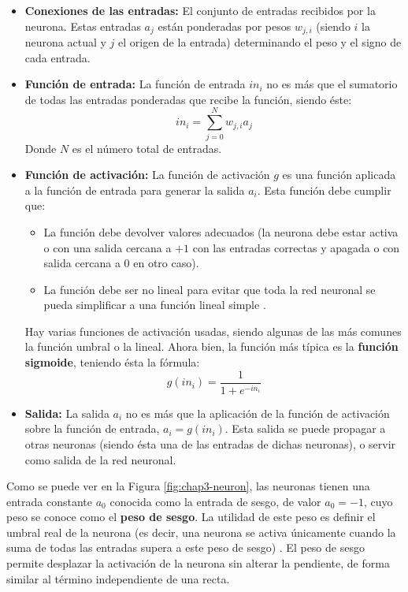 \begin{itemize}
	\item \textbf{Conexiones de las entradas:} El conjunto de entradas recibidos por la neurona. Estas entradas $a_j$ están ponderadas por pesos $w_{j,i}$ (siendo $i$ la neurona actual y $j$ el origen de la entrada) determinando el peso y el signo de cada entrada.
	\item \textbf{Función de entrada:} La función de entrada $in_i$ no es más que el sumatorio de todas las entradas ponderadas que recibe la función, siendo éste:
	\[in_i=\sum_{j=0}^N w_{j,i}a_j\]
Donde $N$ es el número total de entradas.
	\item \textbf{Función de activación:} La función de activación $g$ es una función aplicada a la función de entrada para generar la salida $a_i$. Esta función debe cumplir que:
	\begin{itemize}
		\item La función debe devolver valores adecuados (la neurona debe estar activa o con una salida cercana a $+1$ con las entradas correctas y apagada o con salida cercana a $0$ en otro caso).
		\item La función debe ser no lineal para evitar que toda la red neuronal se pueda simplificar a una función lineal simple \cite{alma991004256519704990}.
	\end{itemize}
	Hay varias funciones de activación usadas, siendo algunas de las más comunes la función umbral o la lineal. Ahora bien, la función más típica es la \textbf{función sigmoide}, teniendo ésta la fórmula:
	\[g(in_i)=\frac{1}{1+e^{-in_i}}\]
	\item \textbf{Salida:} La salida $a_i$ no es más que la aplicación de la función de activación sobre la función de entrada, $a_i = g(in_i)$. Esta salida se puede propagar a otras neuronas (siendo ésta una de las entradas de dichas neuronas), o servir como salida de la red neuronal.
\end{itemize}

	Como se puede ver en la Figura \ref{fig:chap3-neuron}, las neuronas tienen una entrada constante $a_0$ conocida como la entrada de sesgo, de valor $a_0 = -1$, cuyo peso se conoce como el \textbf{peso de sesgo}. La utilidad de este peso es definir el umbral real de la neurona (es decir, una neurona se activa únicamente cuando la suma de todas las entradas supera a este peso de sesgo) \cite{alma991004256519704990}. El peso de sesgo permite desplazar la activación de la neurona sin alterar la pendiente, de forma similar al término independiente de una recta.
	

